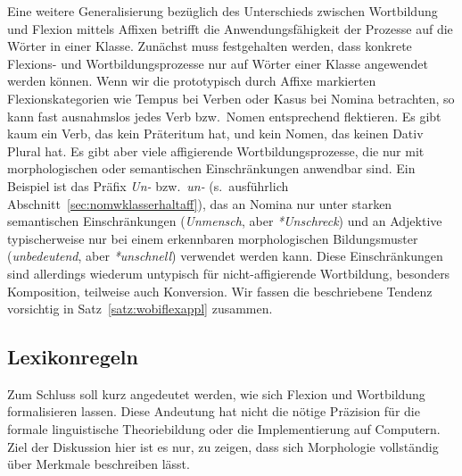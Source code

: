 Eine weitere Generalisierung bezüglich des Unterschieds zwischen Wortbildung und Flexion mittels Affixen betrifft die Anwendungsfähigkeit der Prozesse auf die Wörter in einer Klasse.
Zunächst muss festgehalten werden, dass konkrete Flexions- und Wortbildungsprozesse nur auf Wörter einer Klasse angewendet werden können.
Wenn wir die prototypisch durch Affixe markierten Flexionskategorien wie Tempus bei Verben oder Kasus bei Nomina betrachten, so kann fast ausnahmslos jedes Verb bzw.\ Nomen entsprechend flektieren.
Es gibt \zB kaum ein Verb, das kein Präteritum hat, und kein Nomen, das keinen Dativ Plural hat.
Es gibt aber viele affigierende Wortbildungsprozesse, die nur mit morphologischen oder semantischen Einschränkungen anwendbar sind.
Ein Beispiel ist das Präfix \textit{Un-} bzw.\ \textit{un-} (s.\ ausführlich Abschnitt~\ref{sec:nomwklasserhaltaff}), das an Nomina nur unter starken semantischen Einschränkungen (\textit{Unmensch}, aber \textit{*Unschreck}) und an Adjektive typischerweise nur bei einem erkennbaren morphologischen Bildungsmuster (\textit{unbedeutend}, aber \textit{*unschnell}) verwendet werden kann.
Diese Einschränkungen sind allerdings wiederum untypisch für nicht-affigierende Wortbildung, besonders Komposition, teilweise auch Konversion.
Wir fassen die beschriebene Tendenz vorsichtig in Satz~\ref{satz:wobiflexappl} zusammen.


\subsection{Lexikonregeln}

\label{sec:lexikonregel}

Zum Schluss soll kurz angedeutet werden, wie sich Flexion und Wortbildung formalisieren lassen.
Diese Andeutung hat nicht die nötige Präzision für die formale linguistische Theoriebildung oder die Implementierung auf Computern.
Ziel der Diskussion hier ist es nur, zu zeigen, dass sich Morphologie vollständig über Merkmale beschreiben lässt.

